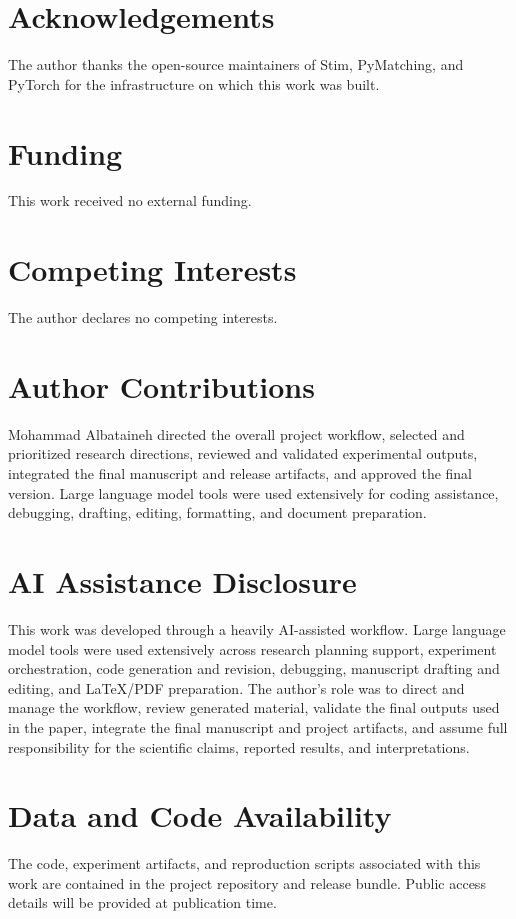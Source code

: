 
\section*{Acknowledgements}

The author thanks the open-source maintainers of Stim, PyMatching, and PyTorch for the infrastructure on which this work was built.

\section*{Funding}

This work received no external funding.

\section*{Competing Interests}

The author declares no competing interests.

\section*{Author Contributions}

Mohammad Albataineh directed the overall project workflow, selected and prioritized research directions, reviewed and validated experimental outputs, integrated the final manuscript and release artifacts, and approved the final version. Large language model tools were used extensively for coding assistance, debugging, drafting, editing, formatting, and document preparation.

\section*{AI Assistance Disclosure}

This work was developed through a heavily AI-assisted workflow. Large language model tools were used extensively across research planning support, experiment orchestration, code generation and revision, debugging, manuscript drafting and editing, and \LaTeX/PDF preparation. The author's role was to direct and manage the workflow, review generated material, validate the final outputs used in the paper, integrate the final manuscript and project artifacts, and assume full responsibility for the scientific claims, reported results, and interpretations.

\section*{Data and Code Availability}

The code, experiment artifacts, and reproduction scripts associated with this work are contained in the project repository and release bundle. Public access details will be provided at publication time.
